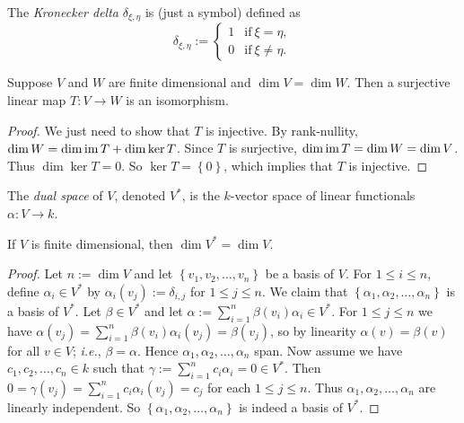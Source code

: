 \begin{dfn}
  The \textit{Kronecker delta} $\delta_{\xi,\eta}$ is (just a symbol)
  defined as
  \[
  \delta_{\xi,\eta} := \begin{cases} 1 & \text{if}\ \xi = \eta, \\
    0 & \text{if}\ \xi \ne \eta. \end{cases}
  \]
\end{dfn}

\begin{lem}
  \label{surjbij}
  Suppose $V$ and $W$ are finite dimensional and $\dim V = \dim
  W$. Then a surjective linear map $T: V \to W$ is an isomorphism.
  \begin{proof}
    We just need to show that $T$ is injective. By rank-nullity, $\dim
    W = \dim \operatorname{im} T + \dim \ker T$. Since $T$ is surjective, $\dim \operatorname{im}
    T= \dim W = \dim V$. Thus $\dim \ker T = 0$. So $\ker T =
    \left\{0\right\}$, which implies that $T$ is injective.
  \end{proof}
\end{lem}

\begin{dfn}
  The \textit{dual space} of $V$, denoted $V^*$, is the $k$-vector
  space of linear functionals $\alpha: V \to k$.
\end{dfn}

\begin{lem}
  \label{dimdual}
  If $V$ is finite dimensional, then $\dim V^* = \dim V$.
  \begin{proof}
    Let $n := \dim V$ and let $\left\{v_1, v_2, \ldots, v_n\right\}$
    be a basis of $V$. For $1 \le i \le n$, define $\alpha_i \in V^*$
    by $\alpha_i(v_j) := \delta_{i,j}$ for $1 \le j \le n$. We claim
    that $\left\{\alpha_1, \alpha_2, \ldots, \alpha_n\right\}$ is a
    basis of $V^*$. Let $\beta \in V^*$ and let $\alpha :=
    \sum_{i=1}^n \beta(v_i) \alpha_i \in V^*$. For $1 \le j \le n$ we
    have $\alpha(v_j) = \sum_{i=1}^n \beta(v_i) \alpha_i(v_j) =
    \beta(v_j)$, so by linearity $\alpha(v) = \beta(v)$ for all $v \in
    V$; \emph{i.e.}, $\beta = \alpha$. Hence $\alpha_1, \alpha_2,
    \ldots, \alpha_n$ span. Now assume we have $c_1, c_2, \ldots, c_n
    \in k$ such that $\gamma := \sum_{i=1}^n c_i \alpha_i = 0 \in
    V^*$. Then $0 = \gamma(v_j) = \sum_{i=1}^n c_i \alpha_i(v_j) =
    c_j$ for each $1 \le j \le n$. Thus $\alpha_1, \alpha_2, \ldots,
    \alpha_n$ are linearly independent. So $\left\{\alpha_1, \alpha_2,
      \ldots, \alpha_n\right\}$ is indeed a basis of $V^*$.
  \end{proof}
\end{lem}

